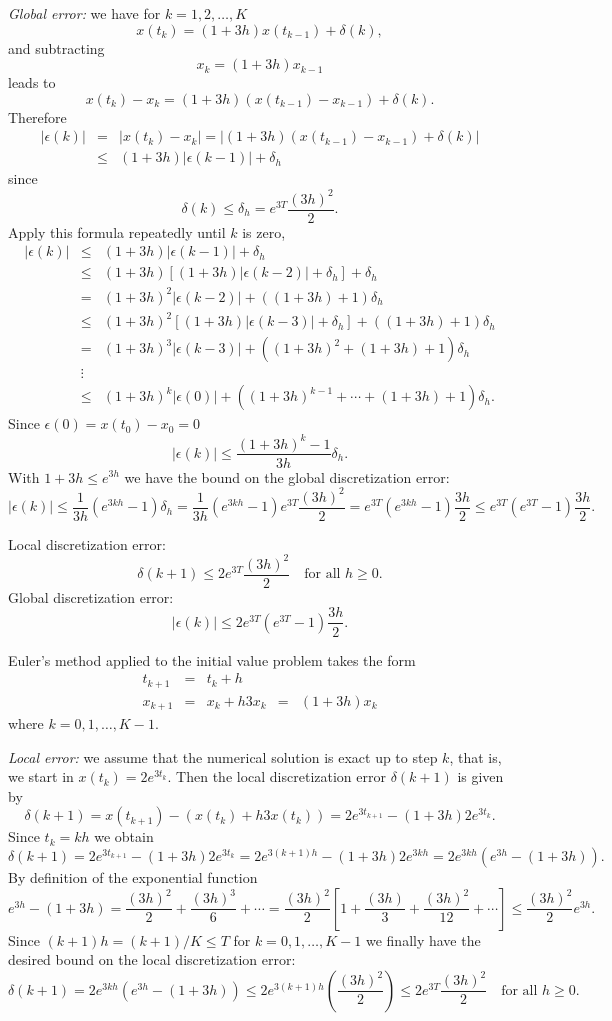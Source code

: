 \documentclass{ximera}
\begin{document}
{\em Global error:} we have for $k=1,2,\ldots,K$
\[
x(t_k)=(1+3h)x(t_{k-1})+\delta(k),
\]
and subtracting
\[
x_k = (1+3h)x_{k-1}
\]
leads to
\[
x(t_k) - x_k = (1+3h)(x(t_{k-1})-x_{k-1})+\delta(k).
\]
Therefore
\begin{eqnarray*}
|\epsilon(k)| & = & |x(t_k) - x_k| =
|(1+3h)(x(t_{k-1})-x_{k-1})+\delta(k)|\\
& \le & (1+3h)|\epsilon(k-1)|+\delta_h
\end{eqnarray*}
since
\[
\delta(k)\le \delta_h = e^{3T}\frac{(3h)^2}{2}.
\]
Apply this formula repeatedly until $k$ is zero,
\[
\begin{array}{rcl}
|\epsilon(k)|&\le&(1+3h)|\epsilon(k-1)|+\delta_h\\
&\le& (1+3h)[(1+3h)|\epsilon(k-2)|+\delta_h]+\delta_h\\
&=& (1+3h)^2|\epsilon(k-2)| + ((1+3h) + 1)\delta_h\\
&\le& (1+3h)^2[(1+3h)|\epsilon(k-3)|+\delta_h] + ((1+3h) + 1)\delta_h\\
&=& (1+3h)^3|\epsilon(k-3)| + ((1+3h)^2 + (1+3h) + 1)\delta_h\\
&\vdots& \\
&\le & (1+3h)^k|\epsilon(0)| + ((1+3h)^{k-1} +\cdots + (1+3h) + 1)\delta_h.
\end{array}
\]
Since $\epsilon(0)=x(t_0) - x_0=0$
\[
|\epsilon(k)| \le \frac{(1+3h)^k -1}{3h}\delta_h.
\]
With $1+3h\le e^{3h}$ we have the bound on the global discretization error:
\[
|\epsilon(k)| \le \frac{1}{3h} (e^{3kh}-1)\delta_h=
\frac{1}{3h}(e^{3kh}-1)e^{3T}\frac{(3h)^2}{2} =
e^{3T}(e^{3kh}-1)\frac{3h}{2}
\le e^{3T}(e^{3T}-1)\frac{3h}{2}.
\]

 \ans Local discretization error:
\[
\delta(k+1) \le
2e^{3T}\frac{(3h)^2}{2} \quad \mbox{for all $h\ge 0$.}
\]
Global discretization error:
\[
|\epsilon(k)| \le 2e^{3T}(e^{3T}-1)\frac{3h}{2}.
\]

\soln Euler's method applied to the initial value problem takes the form
\[
\begin{array}{rclcl}
t_{k+1} & = & t_k+h & & \\
x_{k+1} & = & x_k + h 3x_k & = & (1+3h)x_k
\end{array}
\]
where $k=0,1,\ldots,K-1$.

{\em Local error:} we assume that the
numerical solution is exact up to step $k$, that is,
we start in $x(t_k)=2e^{3t_k}$.  Then the local discretization error
$\delta(k+1)$ is given by
\[
\delta(k+1) = x(t_{k+1}) - (x(t_k) + h 3 x(t_k))=
2e^{3t_{k+1}} - (1+3h)2e^{3t_k}.
\]
Since $t_k = kh$ we obtain
\[
\delta(k+1) = 2e^{3t_{k+1}} - (1+3h)2e^{3t_k} =
2e^{3(k+1)h} - (1+3h)2e^{3kh} = 2e^{3kh}(e^{3h}-(1+3h)).
\]
By definition of the exponential function
\[
e^{3h}-(1+3h) = \frac{(3h)^2}{2}+\frac{(3h)^3}{6}+\cdots =
\frac{(3h)^2}{2}\left[ 1+\frac{(3h)}{3}+\frac{(3h)^2}{12}+\cdots\right]
\le \frac{(3h)^2}{2}e^{3h}.
\]
Since $(k+1)h=(k+1)/K\le T$ for $k=0,1,\ldots,K-1$ we finally have the
desired bound on the local discretization error:
\[
\delta(k+1) = 2e^{3kh}(e^{3h}-(1+3h)) \le
2e^{3(k+1)h}\left(\frac{(3h)^2}{2}\right)\le
2e^{3T}\frac{(3h)^2}{2} \quad \mbox{for all $h\ge 0$.}
\]
\end{document}
